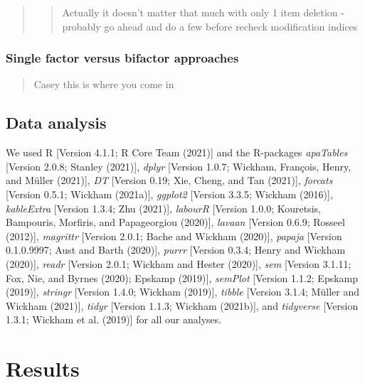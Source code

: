 \documentclass[
  english,
  man]{apa6}
\begin{document}
\begin{quote}
\begin{quote}
Actually it doesn't matter that much with only 1 item deletion - probably go ahead and do a few before recheck modification indices
\end{quote}
\end{quote}

\hypertarget{single-factor-versus-bifactor-approaches}{%
\subsubsection{Single factor versus bifactor approaches}\label{single-factor-versus-bifactor-approaches}}

\begin{quote}
Casey this is where you come in
\end{quote}

\hypertarget{data-analysis}{%
\subsection{Data analysis}\label{data-analysis}}

We used R {[}Version 4.1.1; R Core Team (2021){]} and the R-packages \emph{apaTables} {[}Version 2.0.8; Stanley (2021){]}, \emph{dplyr} {[}Version 1.0.7; Wickham, François, Henry, and Müller (2021){]}, \emph{DT} {[}Version 0.19; Xie, Cheng, and Tan (2021){]}, \emph{forcats} {[}Version 0.5.1; Wickham (2021a){]}, \emph{ggplot2} {[}Version 3.3.5; Wickham (2016){]}, \emph{kableExtra} {[}Version 1.3.4; Zhu (2021){]}, \emph{labourR} {[}Version 1.0.0; Kouretsis, Bampouris, Morfiris, and Papageorgiou (2020){]}, \emph{lavaan} {[}Version 0.6.9; Rosseel (2012){]}, \emph{magrittr} {[}Version 2.0.1; Bache and Wickham (2020){]}, \emph{papaja} {[}Version 0.1.0.9997; Aust and Barth (2020){]}, \emph{purrr} {[}Version 0.3.4; Henry and Wickham (2020){]}, \emph{readr} {[}Version 2.0.1; Wickham and Hester (2020){]}, \emph{sem} {[}Version 3.1.11; Fox, Nie, and Byrnes (2020); Epskamp (2019){]}, \emph{semPlot} {[}Version 1.1.2; Epskamp (2019){]}, \emph{stringr} {[}Version 1.4.0; Wickham (2019){]}, \emph{tibble} {[}Version 3.1.4; Müller and Wickham (2021){]}, \emph{tidyr} {[}Version 1.1.3; Wickham (2021b){]}, and \emph{tidyverse} {[}Version 1.3.1; Wickham et al. (2019){]} for all our analyses.

\hypertarget{results}{%
\section{Results}\label{results}}
\end{document}
